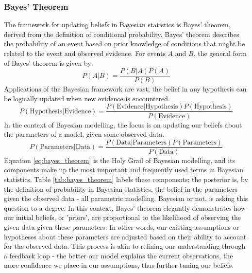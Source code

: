 \subsubsection{Bayes' Theorem}
The framework for updating beliefs in Bayesian statistics is Bayes' theorem,
derived from the definition of conditional probability. Bayes' theorem
describes the probability of an event based on prior knowledge of conditions
that might be related to the event and observed evidence. For events $A$ and
$B$, the general form of Bayes' theorem is given by:
\begin{equation}
  P(A|B) = \frac{P(B|A)P(A)}{P(B)}
\end{equation}
Applications of the Bayesian framework are vast; the belief in any hypothesis
can be logically updated when new evidence is encountered.
\begin{equation}
  P(\text{Hypothesis}|\text{Evidence}) = \frac{P(\text{Evidence}|\text{Hypothesis})P(\text{Hypothesis})}{P(\text{Evidence})}
\end{equation}
In the context of Bayesian modelling, the focus is on updating our beliefs
about the parameters of a model, given some observed data.
\begin{equation}
  \label{eq:bayes_theorem}
  P(\text{Parameters}|\text{Data}) = \frac{P(\text{Data}|\text{Parameters})P(\text{Parameters})}{P(\text{Data})}
\end{equation}
Equation \ref{eq:bayes_theorem} is the Holy Grail of Bayesian modelling, and
its components make up the most important and frequently used terms in Bayesian
statistics. Table \ref{tab:bayes_theorem} labels these components; the
posterior is, by the definition of probability in Bayesian
statistics, the belief in the parameters given the observed data - all
parametric modelling, Bayesian or not, is asking this question to a degree.
In this context, Bayes' theorem elegantly demonstrates how our initial beliefs,
or 'priors', are proportional to the likelihood of observing the given data
given these parameters. In other words, our existing assumptions or hypotheses
about these parameters are adjusted based on their ability to account for the
observed data. This process is akin to refining our understanding through a
feedback loop - the better our model explains the current observations, the
more confidence we place in our assumptions, thus further tuning our beliefs.

